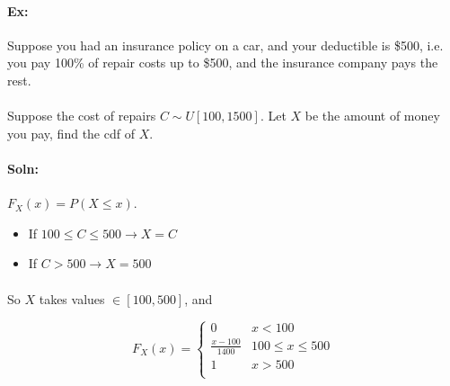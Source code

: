 \documentclass{article}
\begin{document}
    \paragraph{Ex:} Suppose you had an insurance policy on a car, and your deductible is \$500, i.e. you pay
    100\% of repair costs up to \$500, and the insurance company pays the rest.

    \paragraph{}Suppose the cost of repairs $C \sim U[100,1500]$. 
    Let $X$ be the amount of money you pay, find the cdf of $X$.

    \paragraph{Soln:} $F_X(x) = P(X \le x)$. 
    \begin{itemize}
        \item If $100\le C\le 500 \to X = C$ 
        \item If $C > 500 \to X = 500$
    \end{itemize}
    \paragraph{}So $X$ takes values $\in [100,500]$, and

    \[ F_X(x) = \begin{cases}
        0 & x < 100 \\
        \frac{x-100}{1400}& 100 \le x \le 500 \\
        1 & x > 500 \\
        \end{cases}
    \]



    
\end{document}
